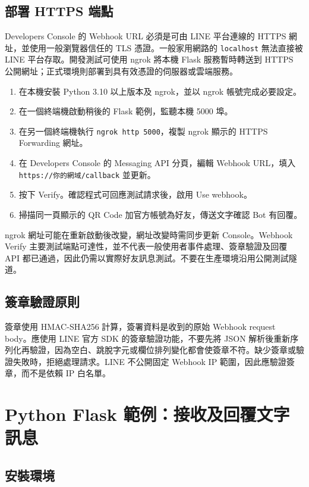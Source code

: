 \documentclass[a4paper,12pt]{report}
\begin{document}
\section{部署 HTTPS 端點}

Developers Console 的 Webhook URL 必須是可由 LINE 平台連線的 HTTPS 網址，並使用一般瀏覽器信任的 TLS 憑證。一般家用網路的 \texttt{localhost} 無法直接被 LINE 平台存取。開發測試可使用 ngrok 將本機 Flask 服務暫時轉送到 HTTPS 公開網址；正式環境則部署到具有效憑證的伺服器或雲端服務。

\begin{enumerate}
  \item 在本機安裝 Python 3.10 以上版本及 ngrok，並以 ngrok 帳號完成必要設定。
  \item 在一個終端機啟動稍後的 Flask 範例，監聽本機 5000 埠。
  \item 在另一個終端機執行 \texttt{ngrok http 5000}，複製 ngrok 顯示的 HTTPS Forwarding 網址。
  \item 在 Developers Console 的 Messaging API 分頁，編輯 Webhook URL，填入 \texttt{https://你的網域/callback} 並更新。
  \item 按下 Verify。確認程式可回應測試請求後，啟用 Use webhook。
  \item 掃描同一頁顯示的 QR Code 加官方帳號為好友，傳送文字確認 Bot 有回覆。
\end{enumerate}

ngrok 網址可能在重新啟動後改變，網址改變時需同步更新 Console。Webhook Verify 主要測試端點可達性，並不代表一般使用者事件處理、簽章驗證及回覆 API 都已通過，因此仍需以實際好友訊息測試。不要在生產環境沿用公開測試隧道。

\section{簽章驗證原則}

簽章使用 HMAC-SHA256 計算，簽署資料是收到的原始 Webhook request body。應使用 LINE 官方 SDK 的簽章驗證功能，不要先將 JSON 解析後重新序列化再驗證，因為空白、跳脫字元或欄位排列變化都會使簽章不符。缺少簽章或驗證失敗時，拒絕處理請求。LINE 不公開固定 Webhook IP 範圍，因此應驗證簽章，而不是依賴 IP 白名單。

\chapter{Python Flask 範例：接收及回覆文字訊息}

\section{安裝環境}
\end{document}
